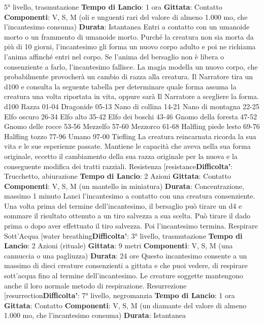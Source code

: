\begin{multicols}{2}
5° livello, trasmutazione
\textbf{Tempo di Lancio}: 1 ora
\textbf{Gittata}: Contatto
\textbf{Componenti}: V, S, M (oli e unguenti rari del valore di
almeno 1.000 mo, che l’incantesimo consuma)
\textbf{Durata}: Istantanea
Entri a contatto con un umanoide morto o un frammento
di umanoide morto. Purché la creatura non sia morta da
più di 10 giorni, l’incantesimo gli forma un nuovo corpo
adulto e poi ne richiama l’anima affinché entri nel corpo.
Se l’anima del bersaglio non è libera o consenziente a
farlo, l’incantesimo fallisce.
La magia modella un nuovo corpo, che probabilmente
provocherà un cambio di razza alla creatura. Il Narratore tira
un d100 e consulta la seguente tabella per determinare
quale forma assuma la creatura una volta riportata in
vita, oppure sarà Il Narratore a scegliere la forma.
d100 Razza
01-04 Dragonide
05-13 Nano di collina
14-21 Nano di montagna
22-25 Elfo oscuro
26-34 Elfo alto
35-42 Elfo dei boschi
43-46 Gnomo della foresta
47-52 Gnomo delle rocce
53-56 Mezzelfo
57-60 Mezzorco
61-68 Halfling piede lesto
69-76 Halfling tozzo
77-96 Umano
97-00 Tiefling
La creatura reincarnata ricorda la sua vita e le sue
esperienze passate. Mantiene le capacità che aveva
nella sua forma originale, eccetto il cambiamento della
sua razza originale per la nuova e la conseguente
modifica dei tratti razziali.
Resistenza
[resistance\textbf{Difficolta'}:
Trucchetto, abiurazione
\textbf{Tempo di Lancio}: 2 Azioni
\textbf{Gittata}: Contatto
\textbf{Componenti}: V, S, M (un mantello in miniatura)
\textbf{Durata}: Concentrazione, massimo 1 minuto
Lanci l’incantesimo a contatto con una creatura
consenziente. Una volta prima del termine
dell’incantesimo, il bersaglio può tirare un d4 e
sommare il risultato ottenuto a un tiro salvezza a sua
scelta. Può tirare il dado prima o dopo aver effettuato il
tiro salvezza. Poi l’incantesimo termina.
Respirare Sott’Acqua
[water breathing\textbf{Difficolta'}:
3° livello, trasmutazione
\textbf{Tempo di Lancio}: 2 Azioni (rituale)
\textbf{Gittata}: 9 metri
\textbf{Componenti}: V, S, M (una cannuccia o una pagliuzza)
\textbf{Durata}: 24 ore
Questo incantesimo consente a un massimo di dieci
creature consenzienti a gittata e che puoi vedere, di
respirare sott’acqua fino al termine dell’incantesimo. Le
creature soggette mantengono anche il loro normale
metodo di respirazione.
Resurrezione
[resurrection\textbf{Difficolta'}:
7° livello, negromanzia
\textbf{Tempo di Lancio}: 1 ora
\textbf{Gittata}: Contatto
\textbf{Componenti}: V, S, M (un diamante del valore di
almeno 1.000 mo, che l’incantesimo consuma)
\textbf{Durata}: Istantanea

\end{multicols}
